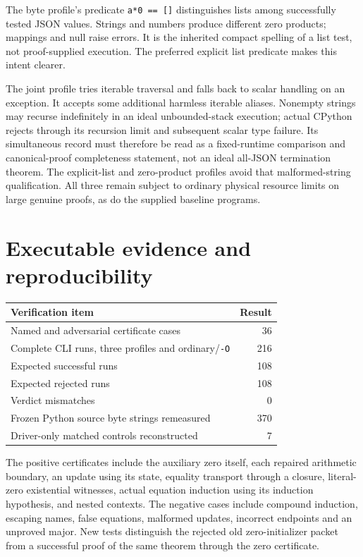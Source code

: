 \documentclass[11pt,letterpaper]{article}
\theoremstyle{definition}\newtheorem{definition}[theorem]{Definition}
\theoremstyle{remark}\newtheorem{remark}[theorem]{Remark}
\begin{document}
The byte profile's predicate \texttt{a*0 == []} distinguishes lists
among successfully tested JSON values. Strings and numbers produce
different zero products; mappings and null raise errors. It is the
inherited compact spelling of a list test, not proof-supplied execution.
The preferred explicit list predicate makes this intent clearer.

The joint profile tries iterable traversal and falls back to scalar
handling on an exception. It accepts some additional harmless iterable
aliases. Nonempty strings may recurse indefinitely in an ideal
unbounded-stack execution; actual CPython rejects through its recursion
limit and subsequent scalar type failure. Its simultaneous record must
therefore be read as a fixed-runtime comparison and canonical-proof
completeness statement, not an ideal all-JSON termination theorem.
The explicit-list and zero-product profiles avoid that malformed-string
qualification. All three remain subject to ordinary physical resource
limits on large genuine proofs, as do the supplied baseline programs.



\section{Executable evidence and reproducibility}
\label{sec:evidence}


\begin{center}
\begin{tabular}{lr}
\toprule
Verification item & Result\\
\midrule
Named and adversarial certificate cases & 36\\
Complete CLI runs, three profiles and ordinary/\texttt{-O} & 216\\
Expected successful runs & 108\\
Expected rejected runs & 108\\
Verdict mismatches & 0\\
Frozen Python source byte strings remeasured & 370\\
Driver-only matched controls reconstructed & 7\\
\bottomrule
\end{tabular}
\end{center}



The positive certificates include the auxiliary zero itself, each
repaired arithmetic boundary, an update using its state, equality
transport through a closure, literal-zero existential witnesses, actual
equation induction using its induction hypothesis, and nested contexts.
The negative cases include compound induction, escaping names, false
equations, malformed updates, incorrect endpoints and an unproved major.
New tests distinguish the rejected old zero-initializer packet from a
successful proof of the same theorem through the zero certificate.
\end{document}
